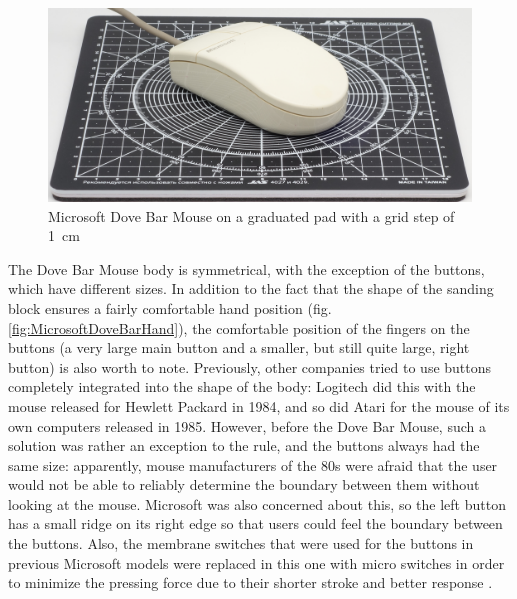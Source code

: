\documentclass[11pt, a4paper]{article}
\begin{document}
\begin{figure}[h]
    \centering
    \includegraphics[scale=0.5]{1987_microsoft_dove_bar_mouse/size.jpg}
    \caption{Microsoft Dove Bar Mouse on a graduated pad with a grid step of 1~cm}
    \label{fig:MicrosoftDoveBarSize}
\end{figure}

The Dove Bar Mouse body is symmetrical, with the exception of the buttons, which have different sizes. In addition to the fact that the shape of the sanding block ensures a fairly comfortable hand position (fig. \ref{fig:MicrosoftDoveBarHand}), the comfortable position of the fingers on the buttons  (a very large main button and a smaller, but still quite large, right button) is also worth to note. Previously, other companies tried to use buttons completely integrated into the shape of the body: Logitech did this with the mouse released for Hewlett Packard in 1984, and so did Atari for the mouse of its own computers released in 1985. However, before the Dove Bar Mouse, such a solution was rather an exception to the rule, and the buttons always had the same size: apparently, mouse manufacturers of the 80s were afraid that the user would not be able to reliably determine the boundary between them without looking at the mouse. Microsoft was also concerned about this, so the left button has a small ridge on its right edge so that users could feel the boundary between the buttons. Also, the membrane switches that were used for the buttons in previous Microsoft models were replaced in this one with micro switches in order to minimize the pressing force due to their shorter stroke and better response \cite{doveBarMousePcMag3, doveBarDesign2}.
\end{document}
